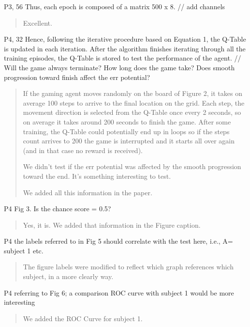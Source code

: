 \documentclass[journal,onecolumn,12pt]{IEEEtran}
\begin{document}
P3, 56 Thus, each epoch is composed of a matrix 500 x 8. // add channels

\begin{quotation}
{\color{blue}
Excellent.
}
\end{quotation}

P4, 32 Hence, following the iterative procedure based on Equation 1, the Q-Table is updated in each iteration. After the algorithm finishes iterating through all the training episodes, the Q-Table is stored to test the performance of the agent.
// Will the game always terminate? How long does the game take? Does smooth progression toward finish affect the err potential?

\begin{quotation}
{\color{blue}

If the gaming agent moves randomly on the board of Figure 2, it takes on average 100 steps to arrive to the final location on the grid.  Each step, the movement direction is selected from the Q-Table once every 2 seconds, so on average it takes around 200 seconds to finish the game.  After some training, the Q-Table could potentially end up in loops so if the steps count arrives to 200 the game is interrupted and it starts all over again (and in that case no reward is received).

We didn't test if the err potential was affected by the smooth progression toward the end.  It's something interesting to test.

We added all this information in the paper.

}
\end{quotation}


P4 Fig 3. Is the chance score = 0.5?

\begin{quotation}
{\color{blue}
Yes, it is.  We added that information in the Figure caption.
}
\end{quotation}

P4 the labels referred to in Fig 5 should correlate with the test here, i.e., A= subject 1 etc.

\begin{quotation}
{\color{blue}
The figure labels were modified to reflect which graph references which subject, in a more clearly way.
}
\end{quotation}

P4 referring to Fig 6; a comparison ROC curve with subject 1 would be more interesting

\begin{quotation}
{\color{blue}
We added the ROC Curve for subject 1.
}
\end{quotation}
\end{document}
